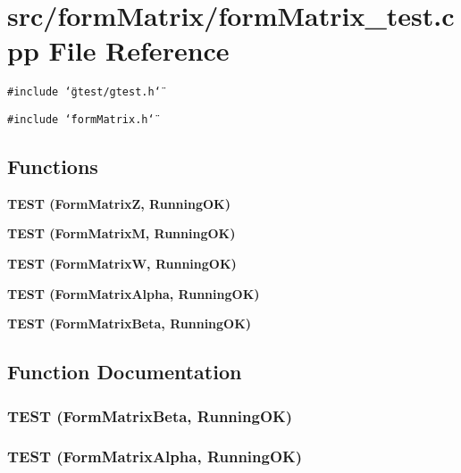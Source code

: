 \section{src/form\-Matrix/form\-Matrix\_\-test.cpp File Reference}
\label{formMatrix__test_8cpp}
{\tt \#include \char`\"{}gtest/gtest.h\char`\"{}}\par
{\tt \#include \char`\"{}form\-Matrix.h\char`\"{}}\par
\subsection*{Functions}
\begin{CompactItemize}
\item 
\bf{TEST} (Form\-Matrix\-Z, Running\-OK)
\item 
\bf{TEST} (Form\-Matrix\-M, Running\-OK)
\item 
\bf{TEST} (Form\-Matrix\-W, Running\-OK)
\item 
\bf{TEST} (Form\-Matrix\-Alpha, Running\-OK)
\item 
\bf{TEST} (Form\-Matrix\-Beta, Running\-OK)
\end{CompactItemize}


\subsection{Function Documentation}
\subsubsection{\setlength{\rightskip}{0pt plus 5cm}TEST (Form\-Matrix\-Beta, Running\-OK)}\label{formMatrix__test_8cpp_ed57f243110d1f1716ee5dd9e324efd5}


\subsubsection{\setlength{\rightskip}{0pt plus 5cm}TEST (Form\-Matrix\-Alpha, Running\-OK)}\label{formMatrix__test_8cpp_3854c707bb70bb4494eaf2ed23c24aae}



